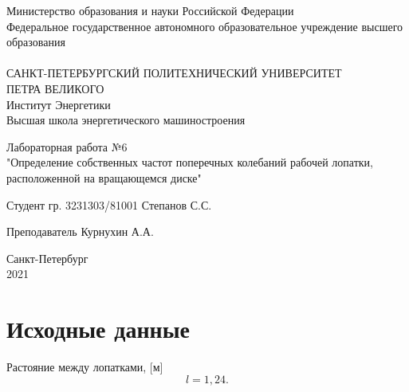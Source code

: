 




\begin{titlepage}

\begin{center}
Министерство образования и науки Российской Федерации\\
Федеральное государственное автономного образовательное учреждение высшего образования\\
\hrulefill\\
\vspace{0.5cm}
САНКТ-ПЕТЕРБУРГСКИЙ ПОЛИТЕХНИЧЕСКИЙ УНИВЕРСИТЕТ\\ ПЕТРА ВЕЛИКОГО\\
\vspace{0.5cm}
Институт Энергетики\\
Высшая школа энергетического машиностроения\\

\end{center}

\vspace{5cm}
\begin{center}
\begin{large}
Лабораторная работа №6\\
"Определение собственных частот поперечных колебаний рабочей лопатки, расположенной на вращающемся диске"
\end{large}
\end{center}

\vspace{5cm}
\hspace{5cm} Студент гр. 3231303/81001 \hrulefill Степанов С.С.


\vspace{0.5cm}
\hspace{5cm} Преподаватель \hrulefill Курнухин А.А. \\


\vfill
\begin{center}
Санкт-Петербург\\
2021
\end{center}


\end{titlepage}

\tableofcontents
\newpage

\section{Исходные данные}

Растояние между лопатками, [м]
\[l = 1,24.\]

